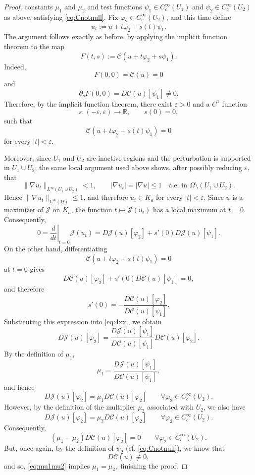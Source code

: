 \documentclass[10pt,a4paper]{amsart}
\begin{document}
\begin{proof}
constants $\mu_1$ and $\mu_2$ and test functions
$\psi_1\in C_c^\infty(U_1)$ and $\psi_2\in C_c^\infty(U_2)$ as above,
satisfying \eqref{eq:Cnotnull}. Fix
$\varphi_2\in C_c^\infty(U_2)$, and this time define
$$
u_t:=u+t\varphi_2+s(t)\psi_1.
$$
The argument follows exactly as before, by applying the implicit function
theorem to the map
$$
F(t,s):=
\mathcal C(u+t\varphi_2+s\psi_1).
$$
Indeed,
$$
F(0,0)=\mathcal C(u)=0
$$
and
$$
\partial_sF(0,0)
=
D\mathcal C(u)[\psi_1]\neq0.
$$
Therefore, by the implicit function theorem, there exist
$\varepsilon>0$ and a $C^1$ function
$$
s:(-\varepsilon,\varepsilon)\to\mathbb R,
\qquad s(0)=0,
$$
such that
$$
\mathcal C(u+t\varphi_2+s(t)\psi_1)=0
$$
for every $|t|<\varepsilon$.

Moreover, since $U_1$ and $U_2$ are inactive regions and the perturbation is supported in $U_1\cup U_2$, the same local argument used above shows, after possibly reducing $\varepsilon$, that
$$
\|\nabla u_t\|_{L^\infty(U_1\cup U_2)}<1,
\qquad
|\nabla u_t|=|\nabla u|\leq1
\quad\text{a.e. in }\Omega\setminus(U_1\cup U_2).
$$
Hence $\|\nabla u_t\|_{L^\infty(\Omega)}\leq1$, and therefore $u_t\in K_a$ for every $|t|<\varepsilon$. Since $u$ is a maximizer of $\mathcal J$ on $K_a$, the function
$t\mapsto\mathcal J(u_t)$ has a local maximum at $t=0$. Consequently,
\begin{equation} \label{eq:4xx}
0
=
\left.\frac{d}{dt}\right|_{t=0}
\mathcal J(u_t)
=
D\mathcal J(u)[\varphi_2]
+s'(0)D\mathcal J(u)[\psi_1].
\end{equation}
On the other hand, differentiating
$$
\mathcal C(u+t\varphi_2+s(t)\psi_1)=0
$$
at $t=0$ gives
$$
D\mathcal C(u)[\varphi_2]
+s'(0)D\mathcal C(u)[\psi_1]
=0,
$$
and therefore
$$
s'(0)
=
-\frac{D\mathcal C(u)[\varphi_2]}
        {D\mathcal C(u)[\psi_1]}.
$$
Substituting this expression into \eqref{eq:4xx}, we obtain
$$
D\mathcal J(u)[\varphi_2]
=
\frac{D\mathcal J(u)[\psi_1]}
     {D\mathcal C(u)[\psi_1]}
D\mathcal C(u)[\varphi_2].
$$
By the definition of $\mu_1$,
$$
\mu_1
=
\frac{D\mathcal J(u)[\psi_1]}
     {D\mathcal C(u)[\psi_1]},
$$
and hence
$$
D\mathcal J(u)[\varphi_2]
=
\mu_1D\mathcal C(u)[\varphi_2]
\qquad
\forall\varphi_2\in C_c^\infty(U_2).
$$
However, by the definition of the multiplier $\mu_2$ associated with
$U_2$, we also have
$$
D\mathcal J(u)[\varphi_2]
=
\mu_2D\mathcal C(u)[\varphi_2]
\qquad
\forall\varphi_2\in C_c^\infty(U_2).
$$
Consequently,
\begin{equation} \label{eq:mu1mu2}
(\mu_1-\mu_2)
D\mathcal C(u)[\varphi_2]=0
\qquad
\forall\varphi_2\in C_c^\infty(U_2).
\end{equation}
But, once again,  by the definition of $\psi_2$ (cf. \eqref{eq:Cnotnull}), we know that
$$
D\mathcal C(u) \not \equiv 0,
$$
and so, \eqref{eq:mu1mu2} implies $\mu_1=\mu_2,$
finishing the proof.
\end{proof}
\end{document}
